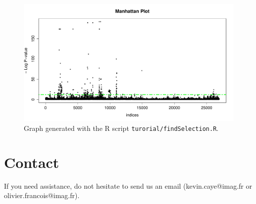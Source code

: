 \documentclass[10pt,a4paper]{article}
\begin{document}

\begin{figure}[h!]\centering
\includegraphics[width=\linewidth]{manhattanPlot.pdf}
\caption{Graph generated with the R script {\tt turorial/findSelection.R}.}\label{fig:manhattanPlot}
\end{figure} 

\section{Contact}
If you need assistance, do not hesitate to send us an email (kevin.caye@imag.fr or olivier.francois@imag.fr). 



\end{document}
